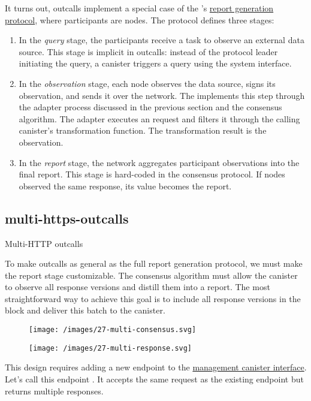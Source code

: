 \documentclass{article}
\begin{document}
It turns out,  outcalls implement a special case of the 's \href{/posts/24-ocr.html#report-generation}{report generation protocol}, where participants are  nodes.
The  protocol defines three stages:
\begin{enumerate}
    \item
    In the \emph{query} stage, the participants receive a task to observe an external data source.
    This stage is implicit in  outcalls: instead of the protocol leader initiating the query, a canister triggers a query using the system interface.
    \item
    In the \emph{observation} stage, each node observes the data source, signs its observation, and sends it over the network.
    The  implements this step through the adapter process discussed in the previous section and the consensus algorithm.
    The adapter executes an  request and filters it through the calling canister's transformation function.
    The transformation result is the observation.
    \item In the \emph{report} stage, the network aggregates participant observations into the final report.
    This stage is hard-coded in the  consensus protocol.
    If  nodes observed the same  response, its value becomes the report.
\end{enumerate}

\subsection{multi-https-outcalls}{Multi-HTTP outcalls}

To make  outcalls as general as the full report generation protocol, we must make the report stage customizable.
The  consensus algorithm must allow the canister to observe all response versions and distill them into a report.
The most straightforward way to achieve this goal is to include all response versions in the block and deliver this batch to the canister.

\begin{figure}[grayscale-diagram,p75]
\texttt{[image: /images/27-multi-consensus.svg]}
\end{figure}

\begin{figure}[grayscale-diagram,p75]
\texttt{[image: /images/27-multi-response.svg]}
\end{figure}

This design requires adding a new endpoint to the \href{https://internetcomputer.org/docs/current/references/ic-interface-spec/#ic-management-canister}{management canister interface}.
Let's call this endpoint .
It accepts the same request as the existing \href{https://internetcomputer.org/docs/current/references/ic-interface-spec/#ic-http_request}{} endpoint but returns multiple responses.
\end{document}
